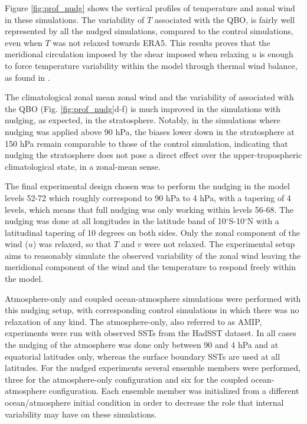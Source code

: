 Figure \ref{fig:prof_nudg} shows the vertical profiles of temperature and zonal wind in these simulations. The variability of $T$ associated with the QBO, is fairly well represented by all the nudged simulations, compared to the control simulations, even when $T$ was not relaxed towards ERA5. This results proves that the meridional circulation imposed by the shear imposed when relaxing $u$ is enough to force temperature variability within the model through thermal wind balance, as found in \cite{martin2021}. 

The climatological zonal mean zonal wind and the variability of associated with the QBO (Fig. \ref{fig:prof_nudg}d-f) is much improved in the simulations with nudging, as expected, in the stratosphere. Notably, in the simulations where nudging was applied above 90 hPa, the biases lower down in the stratosphere at 150 hPa remain comparable to those of the control simulation, indicating that nudging the stratosphere does not pose a direct effect over the upper-tropospheric climatological state, in a zonal-mean sense.


The final experimental design chosen was to perform the nudging in the model levels 52-72 which roughly correspond to 90 hPa to 4 hPa, with a tapering of 4 levels, which means that full nudging was only working within levels 56-68. The nudging was done at all longitudes in the latitude band of 10$^\circ$S-10$^\circ$N with a latitudinal tapering of 10 degrees on both sides. Only the zonal component of the wind ($u$) was relaxed, so that $T$ and $v$ were not relaxed. 
The experimental setup aims to reasonably simulate the observed variability of the zonal wind leaving the meridional component of the wind and the temperature to respond freely within the model. 

Atmosphere-only and coupled ocean-atmosphere simulations were performed with this nudging setup, with corresponding control simulations in which there was no relaxation of any kind. The atmosphere-only, also referred to as AMIP, experiments were run with observed SSTs from the HadSST dataset. In all cases the nudging of the atmosphere was done only between 90 and 4 hPa and at equatorial latitudes only, whereas the surface boundary SSTs are used at all latitudes.
For the nudged experiments several ensemble members were performed, three for the atmosphere-only configuration and six for the coupled ocean-atmosphere configuration. Each ensemble member was initialized from a different ocean/atmosphere initial condition in order to decrease the role that internal variability may have on these simulations. 

